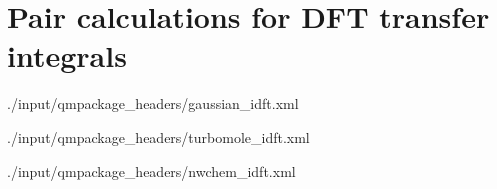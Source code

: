 \section{Pair calculations for DFT transfer integrals}
 {./input/qmpackage_headers/gaussian_idft.xml}

 {./input/qmpackage_headers/turbomole_idft.xml}

 {./input/qmpackage_headers/nwchem_idft.xml}
